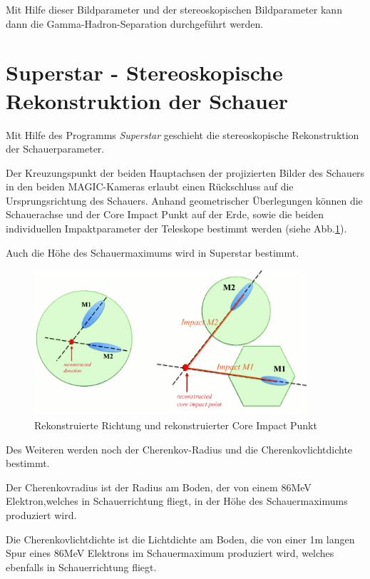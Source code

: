 Mit Hilfe dieser Bildparameter und der stereoskopischen Bildparameter kann dann die Gamma-Hadron-Separation durchgeführt werden.


\section{Superstar - Stereoskopische Rekonstruktion der Schauer}
Mit Hilfe des Programms \textit{Superstar} geschieht die stereoskopische Rekonstruktion der Schauerparameter.

Der Kreuzungspunkt der beiden Hauptachsen der projizierten Bilder des Schauers in den beiden MAGIC-Kameras erlaubt einen Rückschluss auf die Ursprungsrichtung des Schauers.
Anhand geometrischer Überlegungen können die Schauerachse und der Core Impact Punkt auf der Erde, sowie die beiden individuellen Impaktparameter der Teleskope bestimmt werden (siehe Abb.\ref{Superstar}).

Auch die Höhe des Schauermaximums wird in Superstar bestimmt.

\begin{figure}
    \centering
    \includegraphics[width=0.9\textwidth]{./Plots/03_MonteCarlos/Superstar.png}
    \caption{Rekonstruierte Richtung und rekonstruierter Core Impact Punkt \cite{Superstar}}
    \label{Superstar}
\end{figure}

Des Weiteren werden noch der Cherenkov-Radius und die Cherenkovlichtdichte bestimmt.

Der Cherenkovradius ist der Radius am Boden, der von einem 86MeV Elektron,welches in Schauerrichtung fliegt, in der Höhe des Schauermaximums produziert wird.

Die Cherenkovlichtdichte ist die Lichtdichte am Boden, die von einer 1m langen Spur eines 86MeV Elektrons im Schauermaximum produziert wird, welches ebenfalls in Schauerrichtung fliegt.

